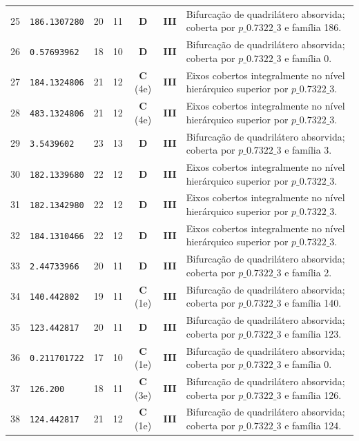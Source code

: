 \documentclass[11pt,a4paper]{article}
\begin{document}
\begin{small}
\begin{longtable}{r l c c c c p{8.8cm}}
25 & \texttt{186.1307280} & 20 & 11 & \textbf{D} & \textbf{III} & Bifurcação de quadrilátero absorvida; coberta por $p\_0.7322\_3$ e família 186. \\
26 & \texttt{0.57693962} & 18 & 10 & \textbf{D} & \textbf{III} & Bifurcação de quadrilátero absorvida; coberta por $p\_0.7322\_3$ e família 0. \\
27 & \texttt{184.1324806} & 21 & 12 & \textbf{C} (4e) & \textbf{III} & Eixos cobertos integralmente no nível hierárquico superior por $p\_0.7322\_3$. \\
28 & \texttt{483.1324806} & 21 & 12 & \textbf{C} (4e) & \textbf{III} & Eixos cobertos integralmente no nível hierárquico superior por $p\_0.7322\_3$. \\
29 & \texttt{3.5439602} & 23 & 13 & \textbf{D} & \textbf{III} & Bifurcação de quadrilátero absorvida; coberta por $p\_0.7322\_3$ e família 3. \\
30 & \texttt{182.1339680} & 22 & 12 & \textbf{D} & \textbf{III} & Eixos cobertos integralmente no nível hierárquico superior por $p\_0.7322\_3$. \\
31 & \texttt{182.1342980} & 22 & 12 & \textbf{D} & \textbf{III} & Eixos cobertos integralmente no nível hierárquico superior por $p\_0.7322\_3$. \\
32 & \texttt{184.1310466} & 22 & 12 & \textbf{D} & \textbf{III} & Eixos cobertos integralmente no nível hierárquico superior por $p\_0.7322\_3$. \\
33 & \texttt{2.44733966} & 20 & 11 & \textbf{D} & \textbf{III} & Bifurcação de quadrilátero absorvida; coberta por $p\_0.7322\_3$ e família 2. \\
34 & \texttt{140.442802} & 19 & 11 & \textbf{C} (1e) & \textbf{III} & Bifurcação de quadrilátero absorvida; coberta por $p\_0.7322\_3$ e família 140. \\
35 & \texttt{123.442817} & 20 & 11 & \textbf{D} & \textbf{III} & Bifurcação de quadrilátero absorvida; coberta por $p\_0.7322\_3$ e família 123. \\
36 & \texttt{0.211701722} & 17 & 10 & \textbf{C} (1e) & \textbf{III} & Bifurcação de quadrilátero absorvida; coberta por $p\_0.7322\_3$ e família 0. \\
37 & \texttt{126.200} & 18 & 11 & \textbf{C} (3e) & \textbf{III} & Bifurcação de quadrilátero absorvida; coberta por $p\_0.7322\_3$ e família 126. \\
38 & \texttt{124.442817} & 21 & 12 & \textbf{C} (1e) & \textbf{III} & Bifurcação de quadrilátero absorvida; coberta por $p\_0.7322\_3$ e família 124. \\

\end{longtable}
\end{small}
\end{document}
